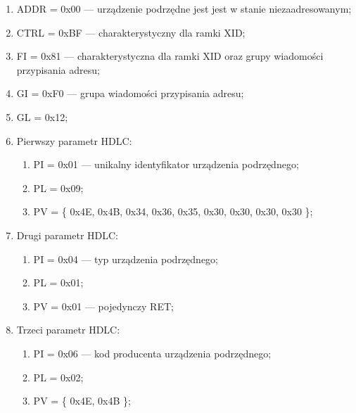 \begin{enumerate}
    \item ADDR = 0x00 --- urządzenie podrzędne jest jest w stanie niezaadresowanym;
    \item CTRL = 0xBF --- charakterystyczny dla ramki XID;
    \item FI = 0x81 --- charakterystyczna dla ramki XID oraz grupy wiadomości przypisania adresu;
    \item GI = 0xF0 --- grupa wiadomości przypisania adresu;
    \item GL = 0x12;
    \item Pierwszy parametr HDLC:
    \begin{enumerate}
        \item PI = 0x01 --- unikalny identyfikator urządzenia podrzędnego;
        \item PL = 0x09;
        \item PV = \{ 0x4E, 0x4B, 0x34, 0x36, 0x35, 0x30, 0x30, 0x30, 0x30 \};
    \end{enumerate}
    \item Drugi parametr HDLC:
    \begin{enumerate}
        \item PI = 0x04 --- typ urządzenia podrzędnego;
        \item PL = 0x01;
        \item PV = 0x01 --- pojedynczy RET;
    \end{enumerate}
    \item Trzeci parametr HDLC:
    \begin{enumerate}
        \item PI = 0x06 --- kod producenta urządzenia podrzędnego;
        \item PL = 0x02;
        \item PV = \{ 0x4E, 0x4B \};
    \end{enumerate}
\end{enumerate}

\newpage

